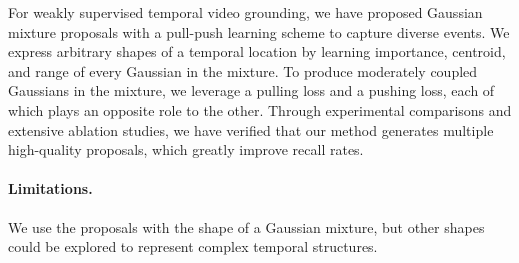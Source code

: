 For weakly supervised temporal video grounding, we have proposed Gaussian mixture proposals with a pull-push learning scheme to capture diverse events.
We express arbitrary shapes of a temporal location by learning importance, centroid, and range of every Gaussian in the mixture.
To produce moderately coupled Gaussians in the mixture, we leverage a pulling loss and a pushing loss, each of which plays an opposite role to the other.
Through experimental comparisons and extensive ablation studies, we have verified that our method generates multiple high-quality proposals, which greatly improve recall rates.

\paragraph{Limitations.}
We use the proposals with the shape of a Gaussian mixture, but other shapes could be explored to represent complex temporal structures.
